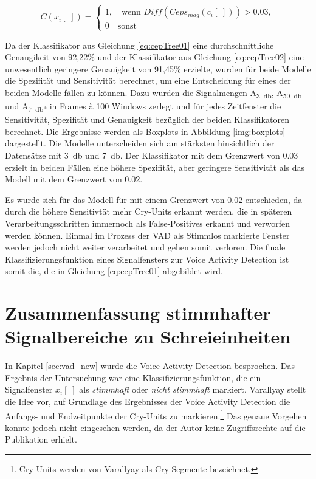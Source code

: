 \begin{equation}
C(x_i[\;]) = \begin{cases}
1, \quad \text{wenn } Diff(Ceps_{mag}(c_i[\;])) > 0.03, \\
0 \quad \text{sonst}
\end{cases}
\label{eq:cepTree02}
\end{equation}

Da der Klassifikator aus Gleichung \ref{eq:cepTree01} eine durchschnittliche Genaugikeit von 92,22\% und der Klassifikator aus Gleichung \ref{eq:cepTree02} eine unwesentlich geringere Genauigkeit von 91,45\% erzielte, wurden für beide Modelle die Spezifität und Sensitivität berechnet, um eine Entscheidung für eines der beiden Modelle fällen zu können. Dazu wurden die Signalmengen A\textsubscript{\SI{3}{\decibel}}, A\textsubscript{\SI{50}{\decibel}} und A\textsubscript{\SI{7}{\decibel}*} in Frames \`{a} 100 Windows zerlegt und für jedes Zeitfenster die Sensitivität, Spezifität und Genauigkeit bezüglich der beiden Klassifikatoren berechnet. Die Ergebnisse werden als Boxplots in Abbildung \ref{img:boxplots} dargestellt. Die Modelle unterscheiden sich am stärksten hinsichtlich der Datensätze mit \SI{3}{\decibel} und \SI{7}{\decibel}. Der Klassifikator mit dem Grenzwert von 0.03 erzielt in beiden Fällen eine höhere Spezifität, aber geringere Sensitivität als das Modell mit dem Grenzwert von 0.02. 

Es wurde sich für das Modell für mit einem Grenzwert von 0.02 entschieden, da durch die höhere Sensitivtät mehr Cry-Units erkannt werden, die in späteren Verarbeitungsschritten immernoch als False-Positives erkannt und verworfen werden können. Einmal im Prozess der VAD als Stimmlos markierte Fenster werden jedoch nicht weiter verarbeitet und gehen somit \glqq verloren\grqq. Die finale Klassifizierungsfunktion eines Signalfensters zur Voice Activity Detection ist somit die, die in Gleichung \ref{eq:cepTree01} abgebildet wird.

\section{Zusammenfassung stimmhafter Signalbereiche zu Schreieinheiten}
\label{sec:marking_cry-units_new}

In Kapitel \ref{sec:vad_new} wurde die Voice Activity Detection besprochen. Das Ergebnis der Untersuchung war eine Klassifizierungsfunktion, die ein Signalfenster $x_i[\;]$ als \emph{stimmhaft} oder \emph{nicht stimmhaft} markiert. Varallyay \cite[S. 16 - 17]{cry_thesis} stellt die Idee vor, auf Grundlage des Ergebnisses der Voice Activity Detection die Anfangs- und Endzeitpunkte der Cry-Units zu markieren.\footnote{\glqq Cry-Units \grqq{} werden von Varallyay als \glqq Cry-Segmente \grqq{} bezeichnet.} Das genaue Vorgehen konnte jedoch nicht eingesehen werden, da der Autor keine Zugriffsrechte auf die Publikation erhielt.

